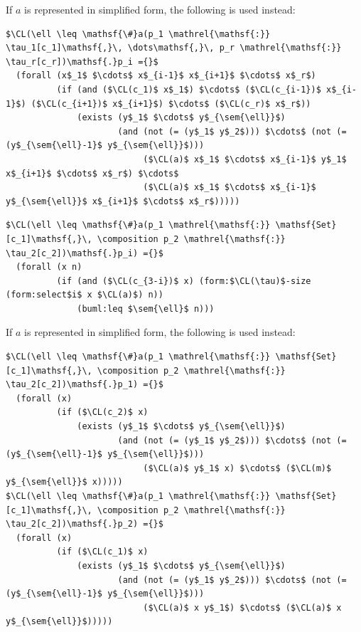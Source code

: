 \documentclass[10pt, a4paper]{isov2}
\newcommand*{\CL}{\ensuremath{\mathsf{CL}}\xspace}
\newcommand{\composition}{\raisebox{0.2pt}{\begin{sideways}\fontsize{6pt}{6pt}\selectfont$\blacklozenge$\end{sideways}}}
\newcommand{\sem}[1]{\mathopen\llbracket#1\mathclose\rrbracket}
\begin{document}
\noindent If $a$ is represented in simplified form, the following is used instead:
\begin{lstlisting}[language=clif, mathescape]
$\CL(\ell \leq \mathsf{\#}a(p_1 \mathrel{\mathsf{:}} \tau_1[c_1]\mathsf{,}\, \dots\mathsf{,}\, p_r \mathrel{\mathsf{:}} \tau_r[c_r])\mathsf{.}p_i ={}$
  (forall (x$_1$ $\cdots$ x$_{i-1}$ x$_{i+1}$ $\cdots$ x$_r$)
          (if (and ($\CL(c_1)$ x$_1$) $\cdots$ ($\CL(c_{i-1})$ x$_{i-1}$) ($\CL(c_{i+1})$ x$_{i+1}$) $\cdots$ ($\CL(c_r)$ x$_r$))
              (exists (y$_1$ $\cdots$ y$_{\sem{\ell}}$)
                      (and (not (= (y$_1$ y$_2$))) $\cdots$ (not (= (y$_{\sem{\ell}-1}$ y$_{\sem{\ell}}$)))
                           ($\CL(a)$ x$_1$ $\cdots$ x$_{i-1}$ y$_1$ x$_{i+1}$ $\cdots$ x$_r$) $\cdots$
                           ($\CL(a)$ x$_1$ $\cdots$ x$_{i-1}$ y$_{\sem{\ell}}$ x$_{i+1}$ $\cdots$ x$_r$)))))
\end{lstlisting}

\begin{lstlisting}[language=clif, mathescape]
$\CL(\ell \leq \mathsf{\#}a(p_1 \mathrel{\mathsf{:}} \mathsf{Set}[c_1]\mathsf{,}\, \composition p_2 \mathrel{\mathsf{:}} \tau_2[c_2])\mathsf{.}p_i) ={}$
  (forall (x n)
          (if (and ($\CL(c_{3-i})$ x) (form:$\CL(\tau)$-size (form:select$i$ x $\CL(a)$) n))
              (buml:leq $\sem{\ell}$ n)))
\end{lstlisting}

\noindent If $a$
is represented in simplified form, the following is used instead:
%
\begin{lstlisting}[language=clif, mathescape]
$\CL(\ell \leq \mathsf{\#}a(p_1 \mathrel{\mathsf{:}} \mathsf{Set}[c_1]\mathsf{,}\, \composition p_2 \mathrel{\mathsf{:}} \tau_2[c_2])\mathsf{.}p_1) ={}$
  (forall (x)
          (if ($\CL(c_2)$ x)
              (exists (y$_1$ $\cdots$ y$_{\sem{\ell}}$)
                      (and (not (= (y$_1$ y$_2$))) $\cdots$ (not (= (y$_{\sem{\ell}-1}$ y$_{\sem{\ell}}$)))
                           ($\CL(a)$ y$_1$ x) $\cdots$ ($\CL(m)$ y$_{\sem{\ell}}$ x)))))
$\CL(\ell \leq \mathsf{\#}a(p_1 \mathrel{\mathsf{:}} \mathsf{Set}[c_1]\mathsf{,}\, \composition p_2 \mathrel{\mathsf{:}} \tau_2[c_2])\mathsf{.}p_2) ={}$
  (forall (x)
          (if ($\CL(c_1)$ x)
              (exists (y$_1$ $\cdots$ y$_{\sem{\ell}}$)
                      (and (not (= (y$_1$ y$_2$))) $\cdots$ (not (= (y$_{\sem{\ell}-1}$ y$_{\sem{\ell}}$)))
                           ($\CL(a)$ x y$_1$) $\cdots$ ($\CL(a)$ x y$_{\sem{\ell}}$)))))
\end{lstlisting}
\end{document}
